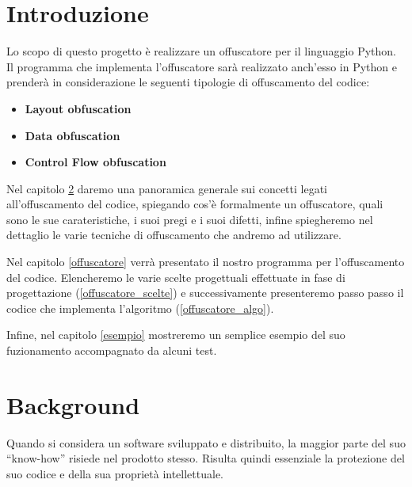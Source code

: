 \documentclass[a4paper,oneside,openright,titlepage,10pt,footinclude,headinclude]{scrbook}
\begin{document}
\begin{frontespizio}
\end{frontespizio}

\tableofcontents

\chapter{Introduzione}\label{introduzione}

Lo scopo di questo progetto è realizzare un offuscatore per il linguaggio Python. Il programma che implementa l'offuscatore sarà realizzato anch'esso in Python e prenderà in considerazione le seguenti tipologie di offuscamento del codice:
\begin{itemize}
\item
\textbf{Layout obfuscation}
\item
\textbf{Data obfuscation}
\item
\textbf{Control Flow obfuscation}
\end{itemize}
Nel capitolo \ref{background} daremo una panoramica generale sui concetti legati all'offuscamento del codice, spiegando cos'è formalmente un offuscatore, quali sono le sue carateristiche, i suoi pregi e i suoi difetti, infine spiegheremo nel dettaglio le varie tecniche di offuscamento che andremo ad utilizzare.

Nel capitolo \ref{offuscatore} verrà presentato il nostro programma per l'offuscamento del codice. Elencheremo le varie scelte progettuali effettuate in fase di progettazione (\ref{offuscatore_scelte}) e successivamente presenteremo passo passo il codice che implementa l'algoritmo (\ref{offuscatore_algo}). 

Infine, nel capitolo \ref{esempio}	mostreremo un semplice esempio del suo fuzionamento accompagnato da alcuni test.

\chapter{Background}\label{background}

Quando si considera un software sviluppato e distribuito, la maggior parte del suo ``know-how'' risiede nel prodotto stesso. Risulta quindi essenziale la protezione del suo codice e della sua proprietà intellettuale. \medskip
\end{document}
